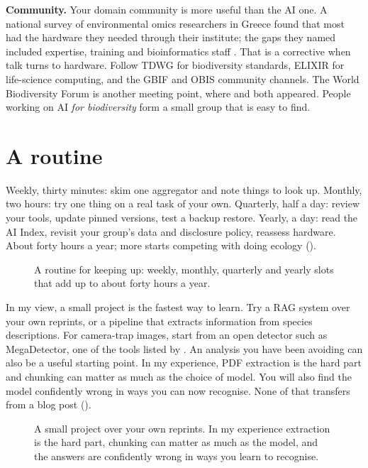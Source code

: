 \textbf{Community.} Your domain community is more useful than the AI one. A national
survey of environmental omics researchers in Greece found that most had the
hardware they needed through their institute; the gaps they named included
expertise, training and bioinformatics staff
\parencite{theodosopoulou2022greek}. That is a corrective when talk turns to
hardware. Follow TDWG for biodiversity standards, ELIXIR for life-science computing,
and the GBIF and OBIS community channels. The World Biodiversity Forum is
another meeting point, where \textcite{pasche2026biodivpmc} and
\textcite{krug2026ipbes} both appeared. People working on AI
\emph{for biodiversity} form a small group that is easy to find.

\section{A routine}

Weekly, thirty minutes: skim one aggregator and note things to look up. Monthly,
two hours: try one thing on a real task of your own. Quarterly, half a day:
review your tools, update pinned versions, test a backup restore. Yearly, a day:
read the AI Index, revisit your group's data and disclosure policy, reassess
hardware. About forty hours a year; more starts competing with doing ecology
().

\begin{figure}[htbp]
\centering
{}
\caption{A routine for keeping up: weekly, monthly, quarterly and yearly slots
that add up to about forty hours a year.}
\label{fig:routine}
\end{figure}

In my view, a small project is the fastest way to learn.
Try a RAG system over your own reprints, or a pipeline that extracts
information from species descriptions. For camera-trap images, start from an
open detector such as MegaDetector, one of the tools listed by
\textcite{tuia2022perspectives}. An analysis you have been avoiding can also be
a useful starting point. In my experience, PDF extraction is the hard part and
chunking can matter as much as the choice of model. You will also find the
model confidently wrong in ways you can now recognise. None of that transfers
from a blog post
().

\begin{figure}[htbp]
\centering
{}
\caption{A small project over your own reprints. In my experience extraction
is the hard part, chunking can matter as much as the model, and the answers are
confidently wrong in ways you learn to recognise.}
\label{fig:smallproject}
\end{figure}

